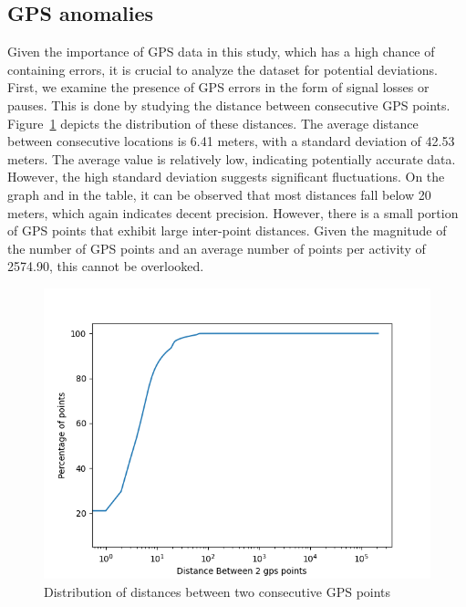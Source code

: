 \documentclass[conference]{IEEEtran}
\begin{document}
\subsection{GPS anomalies}
Given the importance of GPS data in this study, which has a high chance of
containing errors, it is crucial to analyze the dataset for potential
deviations. First, we examine the presence of GPS errors in the form of signal
losses or pauses. This is done by studying the distance between consecutive GPS
points. Figure~\ref{fig:distance_between_gps_points_CDF} depicts the
distribution of these distances. The average distance between consecutive
locations is 6.41 meters, with a standard deviation of 42.53 meters. The
average value is relatively low, indicating potentially accurate data. However,
the high standard deviation suggests significant fluctuations. On the graph and
in the table, it can be observed that most distances fall below 20 meters,
which again indicates decent precision. However, there is a small portion of
GPS points that exhibit large inter-point distances. Given the magnitude of the
number of GPS points and an average number of points per activity of 2574.90,
this cannot be overlooked.
\begin{figure}[h]
    \centering
    \includegraphics[width=\linewidth]{fig/Afwijkingen&Analyses/Graphs/Afstand tussen 2 gps-punten.png}
    \caption{Distribution of distances between two consecutive GPS points}\label{fig:distance_between_gps_points_CDF}
\end{figure}
\end{document}
